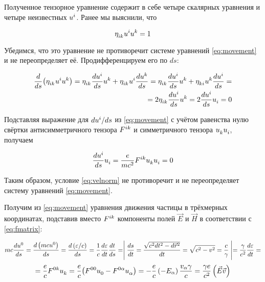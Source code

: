 \documentclass{article}
\begin{document}
Полученное тензорное уравнение содержит в себе четыре скалярных уравнения и четыре неизвестных $\tensor{u}{^i}$. Ранее мы выяснили, что 

\begin{equation}\label{eq:velnorm}
    \tensor{\eta}{_i_k}\tensor{u}{^i}\tensor{u}{^k}=1
\end{equation}

Убедимся, что это уравнение не противоречит системе уравнений \eqref{eq:movement} и не переопределяет её. Продифференцируем его по $ds$:

\begin{equation*}
    \begin{split}
        \frac{d}{ds}\big(\tensor{\eta}{_i_k}\tensor{u}{^i}\tensor{u}{^k}\big)=\tensor{\eta}{_i_k}\frac{d\tensor{u}{^i}}{ds}\tensor{u}{^k}+\tensor{\eta}{_i_k}\tensor{u}{^i}\frac{d\tensor{u}{^k}}{ds}=\tensor{\eta}{_i_k}\frac{d\tensor{u}{^i}}{ds}\tensor{u}{^k}+\tensor{\eta}{_k_i}\tensor{u}{^k}\frac{d\tensor{u}{^i}}{ds}=\\
        =2\tensor{\eta}{_i_k}\frac{d\tensor{u}{^i}}{ds}\tensor{u}{^k}=2\frac{d\tensor{u}{^i}}{ds}\tensor{u}{_i}=0
    \end{split}
\end{equation*}

Подставляя выражение для $d\tensor{u}{^i}/ds$ из \eqref{eq:movement} с учётом равенства нулю свёртки антисимметричного тензора $\tensor{F}{^i^k}$ и симметричного тензора $\tensor{u}{_k}\tensor{u}{_i}$, получаем

\begin{equation*}
    \frac{d\tensor{u}{^i}}{ds}\tensor{u}{_i}=\frac{e}{mc^2}\tensor{F}{^i^k}\tensor{u}{_k}\tensor{u}{_i}=0 
\end{equation*}

Таким образом, условие \eqref{eq:velnorm} не противоречит и не переопределяет систему уравнений \eqref{eq:movement}.

Получим из \eqref{eq:movement} уравнения движения частицы в трёхмерных координатах, подставив вместо $\tensor{F}{^i^k}$ компоненты полей $\vec{E}$ и $\vec{H}$ в соответствии с \eqref{eq:fmatrix}:

\begin{equation*}
    mc\frac{d\tensor{u}{^0}}{ds}=\frac{d\left(mc\tensor{u}{^0}\right)}{ds}=\frac{d\left(\varepsilon/c\right)}{ds}=\frac{1}{c}\frac{d\varepsilon}{dt}\frac{dt}{ds}=\Biggm\lvert\frac{ds}{dt}=\frac{\sqrt{c^2dt^2-d\vec{r}^2}}{dt}=\sqrt{c^2-v^2}=\frac{c}{\gamma}\Biggm\rvert=\frac{\gamma}{c^2}\frac{d\varepsilon}{dt}=
\end{equation*}
\begin{equation*}
    =\frac{e}{c}\tensor{F}{^0^k}\tensor{u}{_k}=\frac{e}{c}\big(\tensor{F}{^0^0}\tensor{u}{_0}-\tensor{F}{^0^\alpha}\tensor{u}{_\alpha}\big)    =-\frac{e}{c}\left(-E_\alpha\right)\frac{v_\alpha\gamma}{c}=\frac{\gamma e}{c^2}\left(\vec{E}\vec{v}\right)
\end{equation*}
\end{document}
